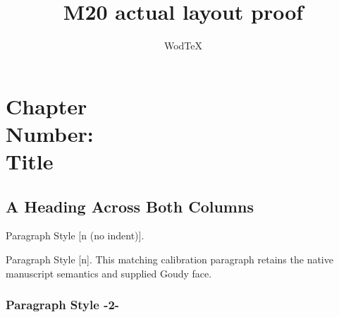 \documentclass{m20book}
\title{M20 actual layout proof}
\author{WodTeX}
\begin{document}
\chapter{Chapter\\Number:\\Title}
\section{A Heading Across Both Columns}
\noindent Paragraph Style [n (no indent)].\par
Paragraph Style [n]. This matching calibration paragraph retains the native manuscript semantics and supplied Goudy face.\par
\subsection{Paragraph Style -2-}
\end{document}

